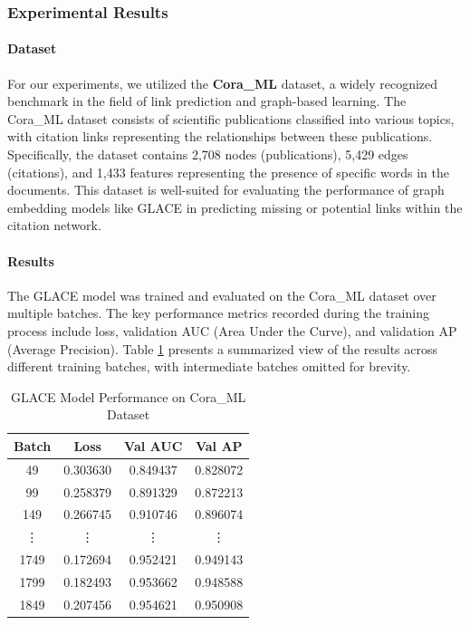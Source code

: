 \documentclass[11pt]{article}
\begin{document}
\subsubsection{Experimental Results}

\paragraph{Dataset}
For our experiments, we utilized the \textbf{Cora\_ML} dataset, a widely recognized benchmark in the field of link prediction and graph-based learning. The Cora\_ML dataset consists of scientific publications classified into various topics, with citation links representing the relationships between these publications. Specifically, the dataset contains 2,708 nodes (publications), 5,429 edges (citations), and 1,433 features representing the presence of specific words in the documents. This dataset is well-suited for evaluating the performance of graph embedding models like GLACE in predicting missing or potential links within the citation network.

\paragraph{Results}
The GLACE model was trained and evaluated on the Cora\_ML dataset over multiple batches. The key performance metrics recorded during the training process include loss, validation AUC (Area Under the Curve), and validation AP (Average Precision). Table \ref{tab:experimental_results} presents a summarized view of the results across different training batches, with intermediate batches omitted for brevity.

\begin{table}[h]
    \centering
    \caption{GLACE Model Performance on Cora\_ML Dataset}
    \label{tab:experimental_results}
    \begin{tabular}{cccc}
        \hline
        \textbf{Batch} & \textbf{Loss} & \textbf{Val AUC} & \textbf{Val AP} \\
        \hline
        49    & 0.303630 & 0.849437 & 0.828072 \\
        99    & 0.258379 & 0.891329 & 0.872213 \\
        149   & 0.266745 & 0.910746 & 0.896074 \\
        \vdots & \vdots   & \vdots    & \vdots    \\
        1749  & 0.172694 & 0.952421 & 0.949143 \\
        1799  & 0.182493 & 0.953662 & 0.948588 \\
        1849  & 0.207456 & 0.954621 & 0.950908 \\
        \hline
    \end{tabular}
\end{table}
\end{document}
